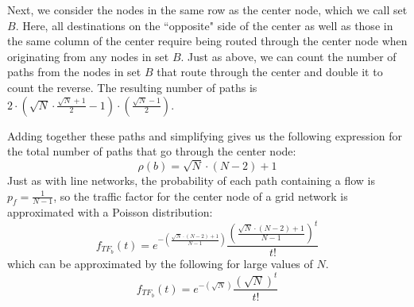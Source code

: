 Next, we consider the nodes in the same row as the center node, which we call set $B$.  
Here, all destinations on the ``opposite" side of the center as well as those in the same column of the center require being routed through the center node when originating from any nodes in set $B$.  Just as above, we can count the number of paths from the nodes in set $B$ that route through the center and double it to count the reverse.  The resulting number of paths is $2 \cdot (\sqrt{N} \cdot \frac{\sqrt{N}+1}{2}-1) \cdot (\frac{\sqrt{N}-1}{2})$.
%

Adding together these paths and simplifying gives us the following expression for the total number of paths that go through the center node: 
\begin{equation}
	\rho(b) = \sqrt{N} \cdot (N-2) + 1
\end{equation}
Just as with line networks, the probability of each path containing a flow is $p_f = \frac{1}{N-1}$, so the traffic factor for the center node of a grid network is approximated with a Poisson distribution:
\begin{equation*}
	f_{TF_b}(t) = e^{-(\frac{\sqrt{N}\cdot(N-2)+1}{N-1})}\frac{(\frac{\sqrt{N}\cdot(N-2)+1}{N-1})^{t}}{t!}
\end{equation*}
which can be approximated by the following for large values of $N$.  
\begin{equation*}
	f_{TF_b}(t) = e^{-(\sqrt{N})}\frac{(\sqrt{N})^{t}}{t!}
\end{equation*}

